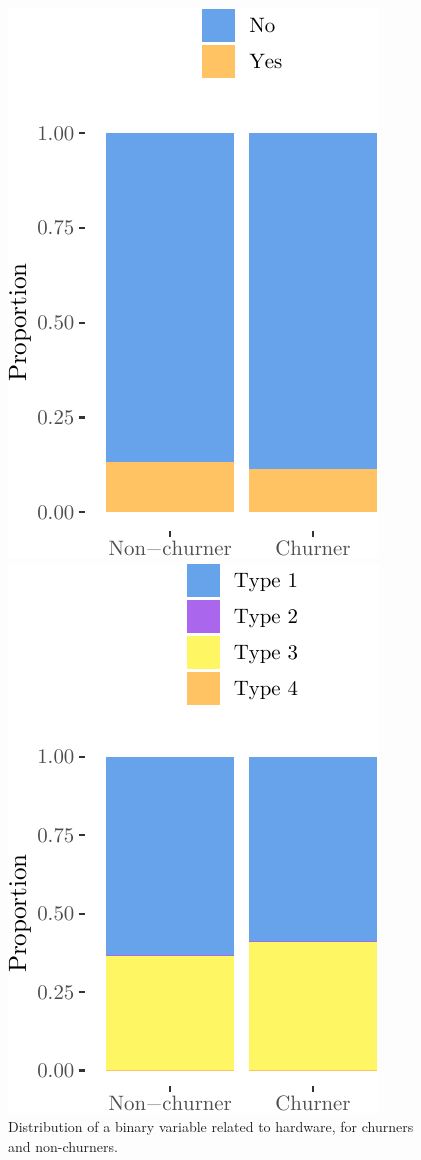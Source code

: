 \begin{figure}
    \centering
    \begin{minipage}{.45\textwidth}
    	\includegraphics{figures/binary.pdf}
    	\caption{Distribution of a binary variable related to hardware, for
    	churners and non-churners.}
    	\label{fig:binary}
    \end{minipage}
    \hspace{0.05\textwidth}
    \begin{minipage}{.45\textwidth}
    	\includegraphics{figures/categorical.pdf}

\end{minipage}
\end{figure}

